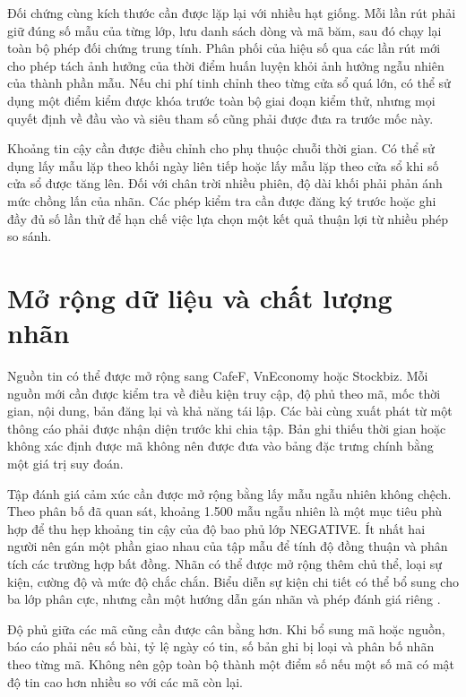\documentclass[12pt, a4paper, oneside]{report}
\begin{document}
Đối chứng cùng kích thước cần được lặp lại với nhiều hạt giống. Mỗi lần rút phải giữ
đúng số mẫu của từng lớp, lưu danh sách dòng và mã băm, sau đó chạy lại toàn bộ phép
đối chứng trung tính. Phân phối của hiệu số qua các lần rút mới cho phép tách ảnh hưởng
của thời điểm huấn luyện khỏi ảnh hưởng ngẫu nhiên của thành phần mẫu. Nếu chi phí tinh
chỉnh theo từng cửa sổ quá lớn, có thể sử dụng một điểm kiểm được khóa trước toàn bộ
giai đoạn kiểm thử, nhưng mọi quyết định về đầu vào và siêu tham số cũng phải được đưa
ra trước mốc này.

Khoảng tin cậy cần được điều chỉnh cho phụ thuộc chuỗi thời gian. Có thể sử dụng lấy mẫu
lặp theo khối ngày liên tiếp hoặc lấy mẫu lặp theo cửa sổ khi số cửa sổ được tăng lên.
Đối với chân trời nhiều phiên, độ dài khối phải phản ánh mức chồng lấn của nhãn. Các
phép kiểm tra cần được đăng ký trước hoặc ghi đầy đủ số lần thử để hạn chế việc lựa chọn
một kết quả thuận lợi từ nhiều phép so sánh.

\section{Mở rộng dữ liệu và chất lượng nhãn}

Nguồn tin có thể được mở rộng sang CafeF, VnEconomy hoặc Stockbiz. Mỗi nguồn mới cần
được kiểm tra về điều kiện truy cập, độ phủ theo mã, mốc thời gian, nội dung, bản đăng
lại và khả năng tái lập. Các bài cùng xuất phát từ một thông cáo phải được nhận diện
trước khi chia tập. Bản ghi thiếu thời gian hoặc không xác định được mã không nên được
đưa vào bảng đặc trưng chính bằng một giá trị suy đoán.

Tập đánh giá cảm xúc cần được mở rộng bằng lấy mẫu ngẫu nhiên không chệch. Theo phân bố
đã quan sát, khoảng 1.500 mẫu ngẫu nhiên là một mục tiêu phù hợp để thu hẹp khoảng tin
cậy của độ bao phủ lớp NEGATIVE. Ít nhất hai người nên gán một phần giao nhau của tập
mẫu để tính độ đồng thuận và phân tích các trường hợp bất đồng. Nhãn có thể được mở
rộng thêm chủ thể, loại sự kiện, cường độ và mức độ chắc chắn. Biểu diễn sự kiện chi
tiết có thể bổ sung cho ba lớp phân cực, nhưng cần một hướng dẫn gán nhãn và phép đánh
giá riêng \cite{Chen2019_191005078v1}.

Độ phủ giữa các mã cũng cần được cân bằng hơn. Khi bổ sung mã hoặc nguồn, báo cáo phải
nêu số bài, tỷ lệ ngày có tin, số bản ghi bị loại và phân bố nhãn theo từng mã. Không
nên gộp toàn bộ thành một điểm số nếu một số mã có mật độ tin cao hơn nhiều so với các
mã còn lại.
\end{document}
